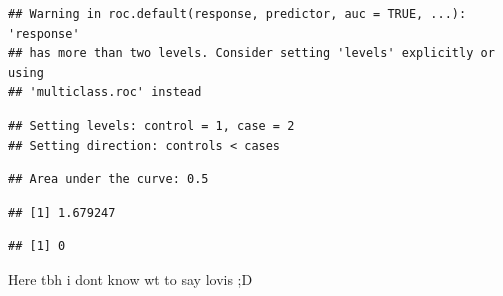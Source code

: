 \documentclass[
]{article}
\newenvironment{Shaded}{\begin{snugshade}}{\end{snugshade}}
\newcommand{\AttributeTok}[1]{\textcolor[rgb]{0.77,0.63,0.00}{#1}}
\newcommand{\DecValTok}[1]{\textcolor[rgb]{0.00,0.00,0.81}{#1}}
\newcommand{\FunctionTok}[1]{\textcolor[rgb]{0.00,0.00,0.00}{#1}}
\newcommand{\NormalTok}[1]{#1}
\newcommand{\OtherTok}[1]{\textcolor[rgb]{0.56,0.35,0.01}{#1}}
\newcommand{\SpecialCharTok}[1]{\textcolor[rgb]{0.00,0.00,0.00}{#1}}
\begin{document}
\begin{verbatim}
## Warning in roc.default(response, predictor, auc = TRUE, ...): 'response'
## has more than two levels. Consider setting 'levels' explicitly or using
## 'multiclass.roc' instead
\end{verbatim}

\begin{verbatim}
## Setting levels: control = 1, case = 2
## Setting direction: controls < cases
\end{verbatim}

\begin{verbatim}
## Area under the curve: 0.5
\end{verbatim}

\begin{Shaded}
\end{Shaded}

\begin{verbatim}
## [1] 1.679247
\end{verbatim}

\begin{Shaded}
\end{Shaded}

\begin{verbatim}
## [1] 0
\end{verbatim}

Here tbh i dont know wt to say lovis ;D
\end{document}
